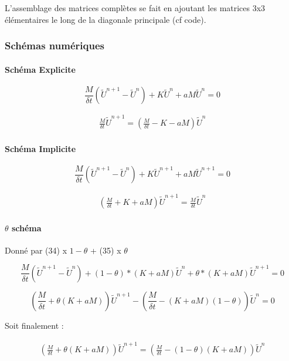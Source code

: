 \documentclass[french]{article}
\begin{document}
L'assemblage des matrices complètes se fait en ajoutant les matrices 3x3 élémentaires le long de la diagonale principale (cf code).


\subsubsection{Schémas numériques}

\paragraph{Schéma Explicite}

\[
\frac{M}{\delta t}(\tilde{U}^{n+1}-\tilde{U}^{n})+K\tilde{U}^{n}+aM\tilde{U}^{n}=0
\]

\begin{align}
\frac{M}{\delta t}\tilde{U}^{n+1}=
\left(
\frac{M}{\delta t}-K-aM
\right)\tilde{U}^{n}
\end{align}

\paragraph{Schéma Implicite}

\[
\frac{M}{\delta t}(\tilde{U}^{n+1}-\tilde{U}^{n})+K\tilde{U}^{n+1}+aM\tilde{U}^{n+1}=0
\]

\begin{align}
\left(
\frac{M}{\delta t}+K+aM
\right)\tilde{U}^{n+1}=
\frac{M}{\delta t}
\tilde{U}^{n}
\end{align}

\paragraph{$\theta$ schéma}

Donné par (34) x $ 1 - \theta $ + (35) x $ \theta $

\[
\frac{M}{\delta t}(\tilde{U}^{n+1}-\tilde{U}^{n})
+(1-\theta)*(K+aM)\tilde{U}^{n}
+\theta*(K+aM)\tilde{U}^{n+1}=0
\]

\[
\left(
\frac{M}{\delta t}+\theta(K+aM)
\right)\tilde{U}^{n+1}-
\left(
\frac{M}{\delta t}-(K+aM)(1-\theta)\right)\tilde{U}^{n}=0
\]

Soit finalement :

\begin{align}
\left(
\frac{M}{\delta t}+\theta(K+aM)
\right)
\tilde{U}^{n+1} = 
\left(
\frac{M}{\delta t}-(1-\theta)(K+aM)
\right)
\tilde{U}^{n}
\end{align}
\end{document}
